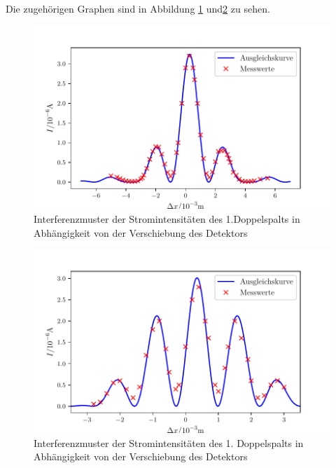 Die zugehörigen Graphen sind in Abbildung \ref{fig:Doppel1} und\ref{fig:Doppel2} zu sehen.
\begin{table}
	\centering
	\caption{Messdaten der Stromintensitäten des Interferenzmusters des 1. Doppelspalts bis zum 2. Nebenmaximum}
	
	
	\label{tab:2}
\end{table}

\begin{table}
	\centering
	\caption{Messdaten der Stromintensitäten des Interferenzmusters des 2. Doppelspalts bis zum 2. Nebenmaximum}
	
	\label{tab:3}
\end{table}


\begin{figure}
\centering
\includegraphics[width=\linewidth-70pt,height=\textheight-70pt,keepaspectratio]{content/images/Doppelspalt1.pdf}
\caption{Interferenzmuster der Stromintensitäten des 1.Doppelspalts in Abhängigkeit von der Verschiebung des Detektors}
\label{fig:Doppel1}
\end{figure}

\begin{figure}
\centering
\includegraphics[width=\linewidth-70pt,height=\textheight-70pt,keepaspectratio]{content/images/Doppelspalt2.pdf}
\caption{Interferenzmuster der Stromintensitäten des 1. Doppelspalts in Abhängigkeit von der Verschiebung des Detektors}
\label{fig:Doppel2}
\end{figure}
